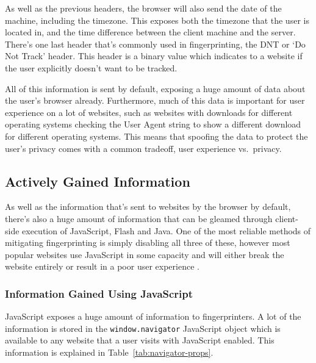 As well as the previous headers, the browser will also send the date of the machine, including the timezone.
This exposes both the timezone that the user is located in, and the time difference between the client machine and the server.
There's one last header that's commonly used in fingerprinting, the DNT or `Do Not Track' header.
This header is a binary value which indicates to a website if the user explicitly doesn't want to be tracked.

All of this information is sent by default, exposing a huge amount of data about the user's browser already.
Furthermore, much of this data is important for user experience on a lot of websites, such as websites with downloads for different operating systems checking the User Agent string to show a different download for different operating systems.
This means that spoofing the data to protect the user's privacy comes with a common tradeoff, user experience vs.\ privacy.

\subsection{Actively Gained Information}

As well as the information that's sent to websites by the browser by default, there's also a huge amount of information that can be gleamed through client-side execution of JavaScript, Flash and Java.
One of the most reliable methods of mitigating fingerprinting is simply disabling all three of these, however most popular websites use JavaScript in some capacity and will either break the website entirely or result in a poor user experience \citep{disable-js}.

\subsubsection{Information Gained Using JavaScript}

JavaScript exposes a huge amount of information to fingerprinters.
A lot of the information is stored in the \texttt{window.navigator} JavaScript object which is available to any website that a user visits with JavaScript enabled.
This information is explained in Table~\ref{tab:navigator-props}.

